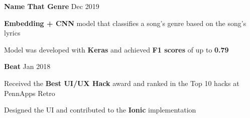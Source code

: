 



\begin{cventries}


\cventry
{\textbf{Name That Genre }\href{https://github.com/Kobai/name-that-genre}{\faGithubSquare}}
{Dec 2019} %
{ %
\begin{cvitems}
\item {\textbf{Embedding + CNN} model that classifies a song's genre based on the song's lyrics}
\item {Model was developed with \textbf{Keras} and achieved \textbf{F1 scores} of up to \textbf{0.79}}
\end{cvitems}
}




\cventry
{\textbf{Beat }\href{https://devpost.com/software/beat}{\faBook}}
{Jan 2018} %
{ %
\begin{cvitems}
\item {Received the \textbf{Best UI/UX Hack} award and ranked in the Top 10 hacks at PennApps Retro}
\item {Designed the UI and contributed to the \textbf{Ionic} implementation}
\end{cvitems}
}


\end{cventries}
